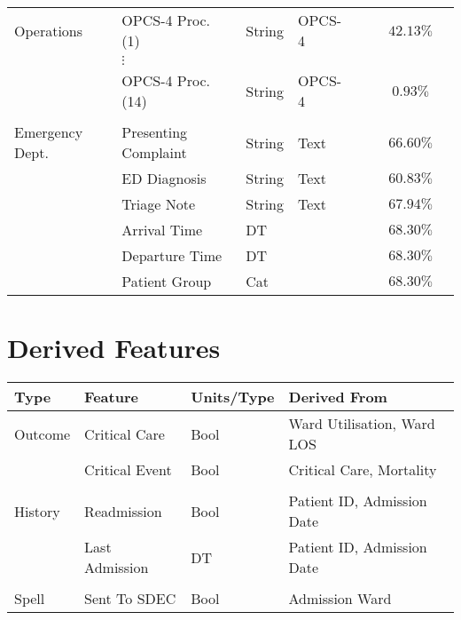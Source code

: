 \documentclass[hf]{ceurart}
\begin{document}
\begin{longtable}{llllcccc}
Operations & OPCS-4 Proc. (1) & String & OPCS-4 & & & $42.13\%$ \\
 & $\vdots$ & & & \\
 & OPCS-4 Proc. (14) & String & OPCS-4 & & & $0.93\%$ \\
\\
  
Emergency Dept. & Presenting Complaint & String & Text & & & $66.60\%$ \\
 & ED Diagnosis & String & Text & & & $60.83\%$ \\
 & Triage Note & String & Text & & & $67.94\%$\\
 & Arrival Time & DT & & & & $68.30\%$\\
 & Departure Time & DT & & & & $68.30\%$\\
 & Patient Group & Cat & & & & $68.30\%$\\
 \hline
 
\end{longtable}

\newpage
\clearpage

\section{Derived Features}
\setlength{\LTleft}{-20cm plus -1fill}
\setlength{\LTright}{\LTleft}
\begin{longtable}{llll}
\hline
\textbf{Type} & \textbf{Feature} & \textbf{Units/Type} & \textbf{Derived From} \\ \hline
\endhead
%
\hline
\endfoot
%
\endlastfoot
%
Outcome & Critical Care & Bool & Ward Utilisation, Ward LOS  \\
 & Critical Event & Bool & Critical Care, Mortality \\
 \\
History & Readmission &  Bool & Patient ID, Admission Date \\
 & Last Admission & DT & Patient ID,   Admission Date \\
 \\
Spell & Sent To SDEC &  Bool & Admission Ward  \\ 
\hline
\end{longtable}
\end{document}
